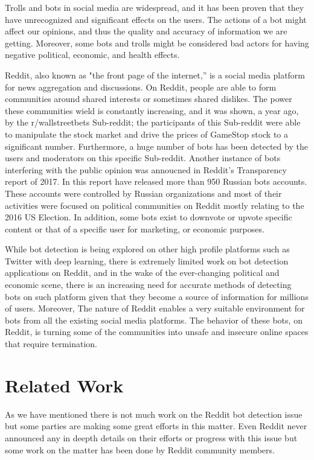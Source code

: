 \documentclass{article}
\begin{document}
Trolls and bots in social media are widespread, and it has been proven that they have unrecognized and significant effects on the users. The actions of a bot might affect our opinions, and thus the quality and accuracy of information we are getting. Moreover, some bots and trolls might be considered bad actors for having negative political, economic, and health effects. \par
Reddit, also known as "the front page of the internet,” is a social media platform for news aggregation and discussions. On Reddit, people are able to form communities around shared interests or sometimes shared dislikes. The power these communities wield is constantly increasing, and it was shown, a year ago, by the r/wallstreetbets Sub-reddit; the participants of this Sub-reddit were able to manipulate the stock market and drive the prices of GameStop stock to a significant number.  Furthermore,  a huge number of bots has been detected by the users and moderators on this specific Sub-reddit. Another instance of bots interfering with the public opinion was annoucned in Reddit's Transparency report of 2017.  In this report have released more than 950 Russian bots accounts. These accounts were controlled by Russian organizations and most of their activities were focused on political communities on Reddit mostly relating to the 2016 US Election. In addition, some bots exist to downvote or upvote specific content or that of a specific user for marketing, or economic purposes. \par
While bot detection is being explored on other high profile platforms such as Twitter with deep learning, there is extremely limited work on bot detection applications on Reddit, and in the wake of the ever-changing political and economic scene, there is an increasing need for accurate methods of detecting bots on such platform given that they become a source of information for millions of users. Moreover, The nature of Reddit enables a very suitable environment for bots from all the existing social media platforms. The behavior of these bots, on Reddit, is turning some of the communities into unsafe and insecure online spaces that require termination.

\section{Related Work}
    As we have mentioned there is not much work on the Reddit bot detection issue but some parties are making some great efforts in this matter. Even Reddit never announced any in deepth details on their efforts or progress with this issue but some work on the matter has been done by Reddit community members.\par
    
\end{document}
